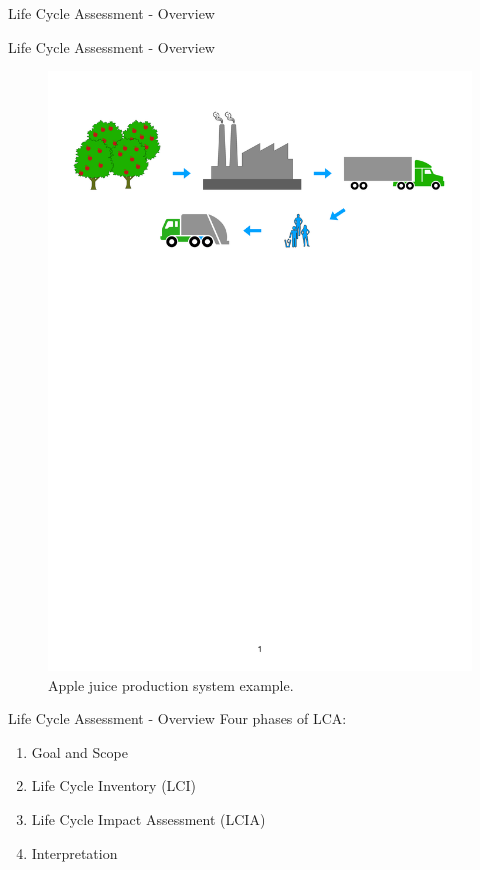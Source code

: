 \begin{frame}
\begin{center}
    \Large
    Life Cycle Assessment - Overview
\end{center}
\end{frame}

\begin{frame}{Life Cycle Assessment - Overview}
\begin{figure}
    \centering
    \includegraphics[width = 0.7\linewidth]{.figures/AppleJuiceExample.pdf}
    \caption{Apple juice production system example.}
\end{figure}
\end{frame}

\begin{frame}{Life Cycle Assessment - Overview}
Four phases of LCA:
\begin{enumerate}
    \item Goal and Scope
    \item Life Cycle Inventory (LCI)
    \item Life Cycle Impact Assessment (LCIA)
    \item Interpretation
\end{enumerate}
\end{frame}

